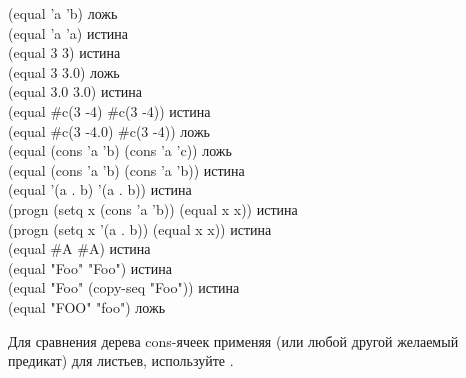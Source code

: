 \begin{defun}[Функция]
\begin{lisp}
(equal 'a 'b) \textrm{ложь} \\
(equal 'a 'a) \textrm{истина} \\
(equal 3 3) \textrm{истина} \\
(equal 3 3.0) \textrm{ложь} \\
(equal 3.0 3.0) \textrm{истина} \\
(equal \#c(3 -4) \#c(3 -4)) \textrm{истина} \\
(equal \#c(3 -4.0) \#c(3 -4)) \textrm{ложь} \\
(equal (cons 'a 'b) (cons 'a 'c)) \textrm{ложь} \\
(equal (cons 'a 'b) (cons 'a 'b)) \textrm{истина} \\
(equal '(a . b) '(a . b)) \textrm{истина} \\
(progn (setq x (cons 'a 'b)) (equal x x)) \textrm{истина} \\
(progn (setq x '(a . b)) (equal x x)) \textrm{истина} \\
(equal \#{\Xbackslash}A \#{\Xbackslash}A) \textrm{истина} \\
(equal "Foo" "Foo") \textrm{истина} \\
(equal "Foo" (copy-seq "Foo")) \textrm{истина} \\
(equal "FOO" "foo") \textrm{ложь}
\end{lisp}
Для сравнения дерева cons-ячеек применяя  (или любой другой желаемый
предикат) для листьев, используйте .

\end{defun}

